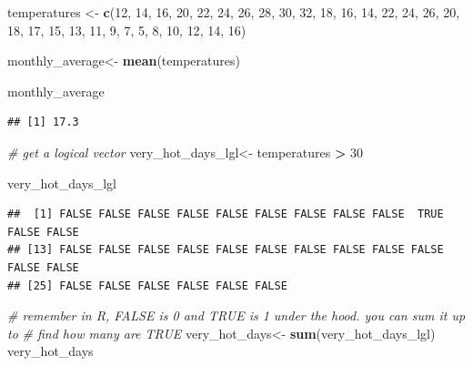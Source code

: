 \documentclass[
]{book}
\newenvironment{Shaded}{\begin{snugshade}}{\end{snugshade}}
\newcommand{\CommentTok}[1]{\textcolor[rgb]{0.56,0.35,0.01}{\textit{#1}}}
\newcommand{\DecValTok}[1]{\textcolor[rgb]{0.00,0.00,0.81}{#1}}
\newcommand{\FunctionTok}[1]{\textcolor[rgb]{0.13,0.29,0.53}{\textbf{#1}}}
\newcommand{\NormalTok}[1]{#1}
\newcommand{\OtherTok}[1]{\textcolor[rgb]{0.56,0.35,0.01}{#1}}
\newcommand{\SpecialCharTok}[1]{\textcolor[rgb]{0.81,0.36,0.00}{\textbf{#1}}}
\begin{document}
\begin{Shaded}
\begin{Highlighting}[]
\NormalTok{temperatures }\OtherTok{\textless{}{-}} \FunctionTok{c}\NormalTok{(}\DecValTok{12}\NormalTok{, }\DecValTok{14}\NormalTok{, }\DecValTok{16}\NormalTok{, }\DecValTok{20}\NormalTok{, }\DecValTok{22}\NormalTok{, }\DecValTok{24}\NormalTok{, }\DecValTok{26}\NormalTok{, }\DecValTok{28}\NormalTok{, }\DecValTok{30}\NormalTok{, }\DecValTok{32}\NormalTok{, }\DecValTok{18}\NormalTok{, }\DecValTok{16}\NormalTok{, }\DecValTok{14}\NormalTok{, }\DecValTok{22}\NormalTok{, }\DecValTok{24}\NormalTok{, }\DecValTok{26}\NormalTok{, }\DecValTok{20}\NormalTok{, }\DecValTok{18}\NormalTok{, }\DecValTok{17}\NormalTok{, }\DecValTok{15}\NormalTok{, }\DecValTok{13}\NormalTok{, }\DecValTok{11}\NormalTok{, }\DecValTok{9}\NormalTok{, }\DecValTok{7}\NormalTok{, }\DecValTok{5}\NormalTok{, }\DecValTok{8}\NormalTok{, }\DecValTok{10}\NormalTok{, }\DecValTok{12}\NormalTok{, }\DecValTok{14}\NormalTok{, }\DecValTok{16}\NormalTok{)}

\NormalTok{monthly\_average}\OtherTok{\textless{}{-}} \FunctionTok{mean}\NormalTok{(temperatures)}

\NormalTok{monthly\_average}
\end{Highlighting}
\end{Shaded}

\begin{verbatim}
## [1] 17.3
\end{verbatim}

\begin{Shaded}
\begin{Highlighting}[]
\CommentTok{\# get a logical vector}
\NormalTok{very\_hot\_days\_lgl}\OtherTok{\textless{}{-}}\NormalTok{ temperatures }\SpecialCharTok{\textgreater{}} \DecValTok{30}

\NormalTok{very\_hot\_days\_lgl}
\end{Highlighting}
\end{Shaded}

\begin{verbatim}
##  [1] FALSE FALSE FALSE FALSE FALSE FALSE FALSE FALSE FALSE  TRUE FALSE FALSE
## [13] FALSE FALSE FALSE FALSE FALSE FALSE FALSE FALSE FALSE FALSE FALSE FALSE
## [25] FALSE FALSE FALSE FALSE FALSE FALSE
\end{verbatim}

\begin{Shaded}
\begin{Highlighting}[]
\CommentTok{\# remember in R, FALSE is 0 and TRUE is 1 under the hood. you can sum it up to }
\CommentTok{\# find how many are TRUE}
\NormalTok{very\_hot\_days}\OtherTok{\textless{}{-}} \FunctionTok{sum}\NormalTok{(very\_hot\_days\_lgl)}
\NormalTok{very\_hot\_days}
\end{Highlighting}
\end{Shaded}
\end{document}
